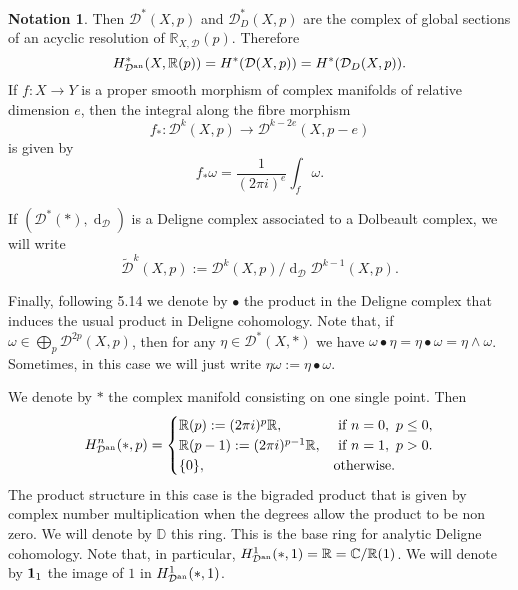 \documentclass[10pt,twoside]{article}
\numberwithin{equation}{section}
\theoremstyle{plain}
\theoremstyle{definition}
\newtheorem{notation}[equation]{Notation}
\DeclareMathOperator{\dd}{d}
\newcommand{\an}{\text{{\rm an}}}
\begin{document}
\begin{notation}
  Then $\mathcal{D}^{\ast}(X,p)$ and $\mathcal{D}_{D}^{\ast}(X,p)$ are
  the complex of global sections of 
  an acyclic resolution of $\mathbb{R}_{X,\mathcal{D}}(p)$. Therefore
  \begin{displaymath}
    H^{\ast}_{\mathcal{D}^{\an}}(X,\mathbb{R}(p))=
    H^{\ast}(\mathcal{D}(X,p))=H^{\ast}(\mathcal{D}_{D}(X,p)).
  \end{displaymath}
  If $f:X\to Y$ is a proper smooth morphism of complex manifolds of
  relative dimension $e$, then the integral along the fibre morphism
  \begin{displaymath}
    f_{\ast}:\mathcal{D}^{k}(X,p)\longrightarrow
    \mathcal{D}^{k-2e}(X,p-e)
  \end{displaymath}
  is given by
  \begin{equation}\label{eq:36}
    f_{\ast} \omega =\frac{1}{(2\pi i)^{e}}\int_{f}\omega .
  \end{equation}

  If $(\mathcal{D}^{\ast}(\ast),\dd_{\mathcal{D}})$ is a
  Deligne complex associated to a Dolbeault complex, we will write 
  \begin{displaymath}
    \widetilde{\mathcal{D}}^{k}(X,p):=
    \mathcal{D}^{k}(X,p)/\dd_{\mathcal{D}}\mathcal{D}^{k-1}(X,p).
  \end{displaymath}

  Finally, following \cite{BurgosKramerKuehn:cacg} 5.14 we denote by
  $\bullet$ the product in the Deligne complex that induces the usual
  product in Deligne cohomology. Note that, if $\omega \in \bigoplus
  _{p}\mathcal{D}^{2p}(X,p)$, then for any $\eta\in
  \mathcal{D}^{\ast}(X,\ast)$ we have $\omega \bullet \eta=\eta\bullet
  \omega =\eta\land \omega $. Sometimes, in this case we will just
  write $\eta\omega :=\eta\bullet\omega $.
\end{notation}

We denote by $\ast$ the complex  manifold
consisting on one single point. Then
\begin{displaymath}
  H^{n}_{\mathcal{D^{\an}}}(\ast,p)=
  \begin{cases}
    \mathbb{R}(p):=(2\pi i)^{p}\mathbb{R}, & \text{ if }n=0,\ p\le 0,\\
    \mathbb{R}(p-1):=(2\pi i)^{p-1}\mathbb{R}, & \text{ if }n=1,\ p>
    0.\\
    \{0\}, & \text{otherwise.}
  \end{cases}
\end{displaymath}
The product structure in this case is the bigraded
product that is given by complex number multiplication when the
degrees allow the product to be non zero. We will denote by
$\mathbb{D}$ this ring. This is the base ring for analytic Deligne
cohomology. Note that, in particular, $
H^{1}_{\mathcal{D^{\an}}}(\ast,1)=\mathbb{R}=\mathbb{C}/\mathbb{R}(1)$. We
will denote by  
${\bf 1}_{1}$ the image of $1$ in $H^{1}_{\mathcal{D^{\an}}}(\ast,1)$. 
\end{document}
